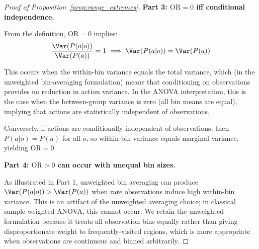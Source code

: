 \begin{proof}[Proof of Proposition~\ref{prop:range_extremes}]
\textbf{Part 3: $\mathrm{OR} = 0$ iff conditional independence.}

From the definition, $\mathrm{OR} = 0$ implies:
\begin{equation}
\frac{\Var(P(a|o))}{\Var(P(a))} = 1 \implies \Var(P(a|o)) = \Var(P(a))
\end{equation}

This occurs when the within-bin variance equals the total variance, which (in the unweighted bin-averaging formulation) means that conditioning on observations provides no reduction in action variance. In the ANOVA interpretation, this is the case when the between-group variance is zero (all bin means are equal), implying that actions are statistically independent of observations.

Conversely, if actions are conditionally independent of observations, then $P(a|o) = P(a)$ for all $o$, so within-bin variance equals marginal variance, yielding $\mathrm{OR} = 0$.

\textbf{Part 4: $\mathrm{OR} > 0$ can occur with unequal bin sizes.}

As illustrated in Part 1, unweighted bin averaging can produce $\Var(P(a|o)) > \Var(P(a))$ when rare observations induce high within-bin variance. This is an artifact of the unweighted averaging choice; in classical sample-weighted ANOVA, this cannot occur. We retain the unweighted formulation because it treats all observation bins equally rather than giving disproportionate weight to frequently-visited regions, which is more appropriate when observations are continuous and binned arbitrarily.
\end{proof}

